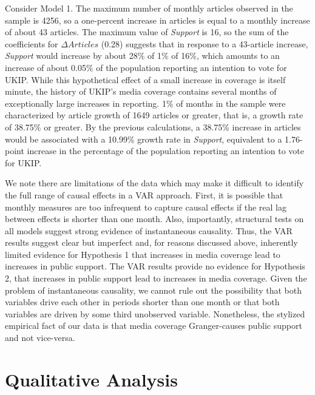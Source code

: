 \documentclass[12pt,article]{article}
\begin{document}
Consider Model 1. The maximum number of monthly articles observed in the
sample is 4256, so a one-percent increase in articles is equal to a
monthly increase of about 43 articles. The maximum value of
\emph{Support} is 16, so the sum of the coefficients for
\(\Delta Articles\) (0.28) suggests that in response to a 43-article
increase, \emph{Support} would increase by about 28\% of 1\% of 16\%,
which amounts to an increase of about 0.05\% of the population reporting
an intention to vote for UKIP. While this hypothetical effect of a small
increase in coverage is itself minute, the history of UKIP's media
coverage contains several months of exceptionally large increases in
reporting. 1\% of months in the sample were characterized by article
growth of 1649 articles or greater, that is, a growth rate of 38.75\% or
greater. By the previous calculations, a 38.75\% increase in articles
would be associated with a 10.99\% growth rate in \emph{Support},
equivalent to a 1.76-point increase in the percentage of the population
reporting an intention to vote for UKIP.

We note there are limitations of the data which may make it difficult to
identify the full range of causal effects in a VAR approach. First, it
is possible that monthly measures are too infrequent to capture causal
effects if the real lag between effects is shorter than one month. Also,
importantly, structural tests on all models suggest strong evidence of
instantaneous causality. Thus, the VAR results suggest clear but
imperfect and, for reasons discussed above, inherently limited evidence
for Hypothesis 1 that increases in media coverage lead to increases in
public support. The VAR results provide no evidence for Hypothesis 2,
that increases in public support lead to increases in media coverage.
Given the problem of instantaneous causality, we cannot rule out the
possibility that both variables drive each other in periods shorter than
one month or that both variables are driven by some third unobserved
variable. Nonetheless, the stylized empirical fact of our data is that
media coverage Granger-causes public support and not vice-versa.

\section{Qualitative Analysis}\label{qualitative-analysis}
\end{document}
